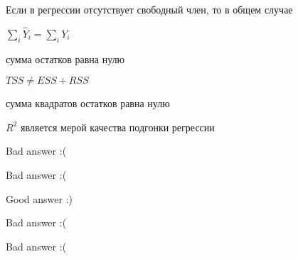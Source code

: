 
\begin{question}
Если в регрессии отсутствует свободный член, то в общем случае
\begin{answerlist}
  \item \(\sum_i \hat Y_i = \sum_i Y_i\)
  \item сумма остатков равна нулю
  \item \(TSS \neq ESS + RSS\)
  \item сумма квадратов остатков равна нулю
  \item \(R^2\) является мерой качества подгонки регрессии
\end{answerlist}
\end{question}

\begin{solution}
\begin{answerlist}
  \item Bad answer :(
  \item Bad answer :(
  \item Good answer :)
  \item Bad answer :(
  \item Bad answer :(
\end{answerlist}
\end{solution}

